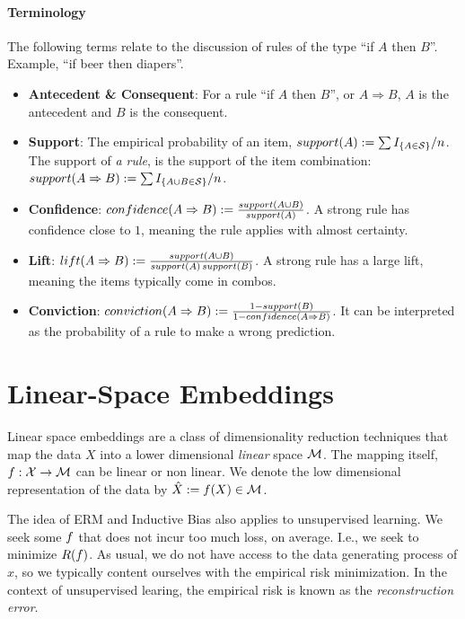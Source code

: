 \paragraph{Terminology}
The following terms relate to the discussion of rules of the type ``if $A$ then $B$''. Example, ``if beer then diapers''.
\begin{itemize}
\item \textbf{Antecedent \& Consequent}: For a rule ``if $A$ then $B$'', or $A \Rightarrow B$, $A$ is the antecedent and $B$ is the consequent.
\item \textbf{Support}: The empirical probability of an item, $\mathop{support}(A):=\sum I_{\left\{ A \in \mathcal{S} \right\}}/n$. The support of \emph{a rule}, is the support of the item combination: $\mathop{support}(A \Rightarrow B):=\sum I_{\left\{ A \cup B \in \mathcal{S} \right\}}/n$.
\item \textbf{Confidence}: $\mathop{confidence}(A \Rightarrow B):=\frac{\mathop{support}(A \cup B)}{\mathop{support}(A)}$. A strong rule has confidence close to $1$, meaning the rule applies with almost certainty.
\item \textbf{Lift}: $\mathop{lift}(A \Rightarrow B):=\frac{\mathop{support}(A \cup B)}{\mathop{support}(A) \mathop{support}(B)}$. A strong rule has a large lift, meaning the items typically come in combos.
\item \textbf{Conviction}: $\mathop{conviction}(A \Rightarrow B):=\frac{1-\mathop{support}(B)}{1-\mathop{confidence}(A \Rightarrow B)}$. It can be interpreted as the probability of a rule to make a wrong prediction.
\end{itemize}

















\section{Linear-Space Embeddings}
\label{sec:dim_reduce_linear}

Linear space embeddings are a class of dimensionality reduction techniques that map the data $X$ into a lower dimensional \emph{linear} space $\mathcal{M}$. 
The mapping itself, $f: \mathcal{X} \to \mathcal{M}$ can be linear or non linear.
We denote the low dimensional representation of the data by $\hat{X}:=f(X) \in \mathcal{M}$.

The idea of ERM and Inductive Bias also applies to unsupervised learning.
We seek some $f$ that does not incur too much loss, on average. I.e., we seek to minimize $R(f)$.
As usual, we do not have access to the data generating process of $x$, so we typically content ourselves with the empirical risk minimization.
In the context of unsupervised learing, the empirical risk is known as the \emph{reconstruction error}.


